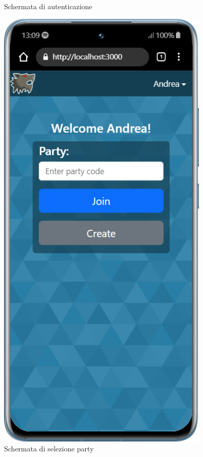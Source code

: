 \begin{figure}[H]
\begin{minipage}{0.45\textwidth}
        \caption{Schermata di autenticazione}
        \label{fig:login_mobile}
    \end{minipage}\hfill
    \begin{minipage}{0.45\textwidth}
        \centering
        \includegraphics[width=0.9\textwidth]{img/screen/mobile/party_mobile.png}
        \caption{Schermata di selezione party}
        \label{fig:party_mobile}
    \end{minipage}
\end{figure}


